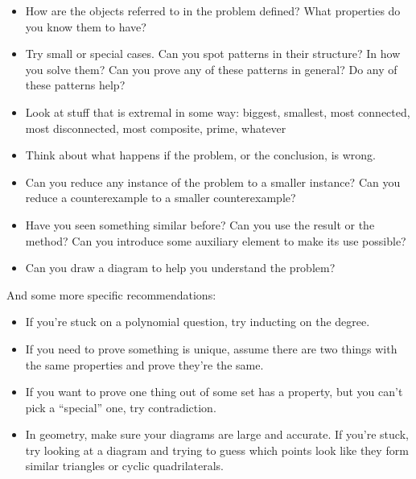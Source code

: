 \begin{itemize}
  \item How are the objects referred to in the problem defined? What properties
    do you know them to have?
  \item Try small or special cases. Can you spot patterns in their structure? In
    how you solve them? Can you prove any of these patterns in general? Do any
    of these patterns help?
  \item Look at stuff that is extremal in some way: biggest, smallest, most
    connected, most disconnected, most composite, prime, whatever
  \item Think about what happens if the problem, or the conclusion, is wrong.
  \item Can you reduce any instance of the problem to a smaller instance? 
    Can you reduce a counterexample to a smaller counterexample?
  \item Have you seen something similar before? Can you use the result or the
    method? Can you introduce some auxiliary element to make its use possible?
  \item Can you draw a diagram to help you understand the problem?
\end{itemize}
And some more specific recommendations:
\begin{itemize}
  \item If you're stuck on a polynomial question, try inducting on the degree.
  \item If you need to prove something is unique, assume there are two things
    with the same properties and prove they're the same.
  \item If you want to prove one thing out of some set has a property, but you
    can't pick a ``special'' one, try contradiction.
  \item In geometry, make sure your diagrams are large and accurate. If you're
    stuck, try looking at a diagram and trying to guess which points look like
    they form similar triangles or cyclic quadrilaterals.
\end{itemize}
